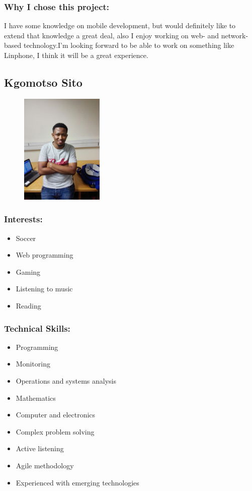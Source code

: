 \subsubsection{Why I chose this project:}
	\par{I have some knowledge on mobile development, but would definitely like to extend that knowledge a great deal, also I enjoy working on web- and network-based technology.I'm looking forward to be able to work on something like Linphone, I think it will be a great experience.}

\newpage
\subsection{Kgomotso Sito}
\begin{figure}[h]
			\center
			\includegraphics[height=200px]{images/Kgomotso.jpg}
\end{figure}
\subsubsection{Interests:}
	\begin{itemize}
		\item Soccer
		\item Web programming
		\item Gaming
		\item Listening to music 
		\item Reading 
	\end{itemize}
\subsubsection{Technical Skills:}
	\begin{itemize}
		\item Programming
		\item Monitoring
		\item Operations and systems analysis
		\item Mathematics
		\item Computer and electronics 
		\item Complex problem solving
		\item Active listening
		\item Agile methodology
		\item Experienced with emerging technologies	 
	\end{itemize}
	
